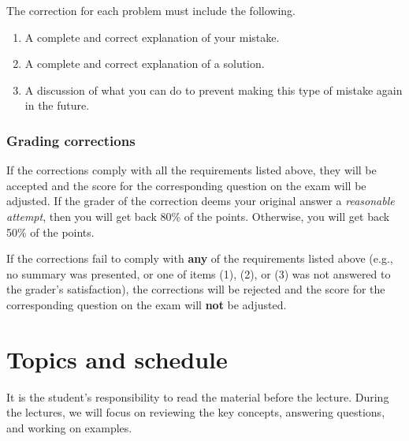 \documentclass[11pt]{article}
\begin{document}
The correction for each problem must include the following.

\begin{enumerate}
\item A complete and correct explanation of your mistake.
\item A complete and correct explanation of a solution.
\item A discussion of what you can do to prevent making this type of mistake again
in the future.
\end{enumerate}

\subsubsection*{Grading corrections}
\label{sec:orgc056562}
If the corrections comply with all the requirements listed above, they will be
accepted and the score for the corresponding question on the exam will be
adjusted. If the grader of the correction deems your original answer a
\emph{reasonable attempt}, then you will get back 80\% of the points. Otherwise, you
will get back 50\% of the points.

If the corrections fail to comply with \textbf{any} of the requirements listed above
(e.g., no summary was presented, or one of items (1), (2), or (3) was not
answered to the grader’s satisfaction), the corrections will be rejected and
the score for the corresponding question on the exam will \textbf{not} be adjusted.

\section*{Topics and schedule}
\label{sec:orgd7528bb}
It is the student's responsibility to read the material before the lecture.
During the lectures, we will focus on reviewing the key concepts, answering
questions, and working on examples.
\end{document}
